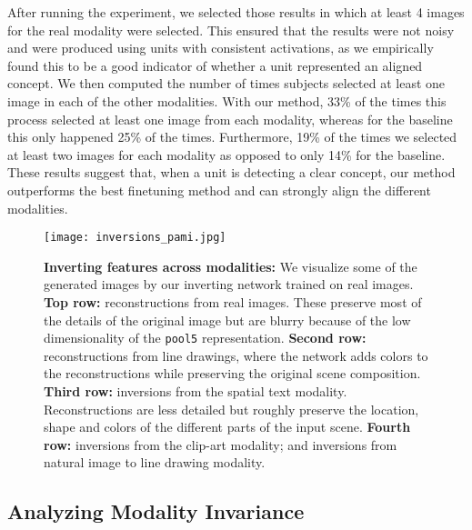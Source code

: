 \documentclass[10pt,journal,compsoc]{IEEEtran}
\begin{document}
	After running the experiment, we selected those results in which at least 4 images for the real modality were selected. This ensured that the results were not noisy and were produced using units with consistent activations, as we empirically found this to be a good indicator of whether a unit represented an aligned concept. We then computed the number of times subjects selected at least one image in each of the other modalities. With our method, 33\% of the times this process selected at least one image from each modality, whereas for the baseline this only happened 25\% of the times. Furthermore, 19\% of the times we selected at least two images for each modality as opposed to only 14\% for the baseline.  These results suggest that, when a unit is detecting a clear concept, our method outperforms the best finetuning method and can strongly align the different modalities.
	
	    
    	\begin{figure*}[t]
    	\begin{center}
    		\texttt{[image: inversions\_pami.jpg]}
    	\end{center}
    	\caption{
    	\textbf{Inverting features across modalities:} We visualize some of the generated images by our inverting network trained on real images. \textbf{Top row:} reconstructions from real images. These preserve most of the details of the original image but are blurry because of the low dimensionality of the \texttt{pool5} representation. \textbf{Second row:} reconstructions from line drawings, where the network adds colors to the reconstructions while preserving the original scene composition. \textbf{Third row:} inversions from the spatial text modality. Reconstructions are less detailed but roughly preserve the location, shape and colors of the different parts of the input scene. \textbf{Fourth row:} inversions from the clip-art modality; and inversions from natural image to line drawing modality.
    	}
    	\label{fig:generated_imgs}
	\end{figure*}

    \subsection{Analyzing Modality Invariance}
\end{document}
